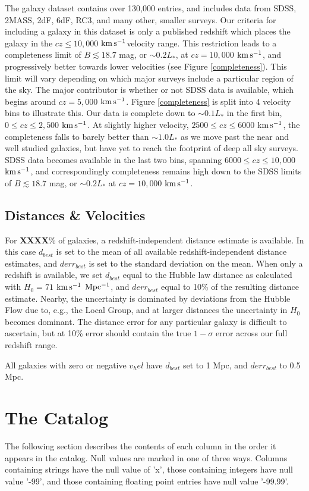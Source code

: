 \documentclass[iop]{emulateapj-rtx4}
\newcommand{\kms}{$\rm km\, s^{-1}$}
\begin{document}
The galaxy dataset contains over 130,000 entries, and includes data from SDSS, 2MASS, 2dF, 6dF, RC3, and many other, smaller surveys. Our criteria for including a galaxy in this dataset is only a published redshift which places the galaxy in the $cz \leq 10,000$ \kms velocity range. This restriction leads to a completeness limit of $B \lesssim 18.7$ mag, or $\sim0.2 L_*$, at $cz = 10,000$ \kms, and progressively better towards lower velocities (see Figure \ref{completeness}). This limit will vary depending on which major surveys include a particular region of the sky. The major contributor is whether or not SDSS data is available, which begins around $cz = 5,000$ \kms. Figure \ref{completeness} is split into 4 velocity bins to illustrate this. Our data is complete down to $\sim0.1 L_*$ in the first bin, $0 \leq cz \leq 2,500$ \kms. At slightly higher velocity, $2500 \leq cz \leq 6000$ \kms, the completeness falls to barely better than $\sim1.0 L_*$ as we move past the near and well studied galaxies, but have yet to reach the footprint of deep all sky surveys. SDSS data becomes available in the last two bins, spanning $6000 \leq cz \leq 10,000$ \kms, and correspondingly completeness remains high down to the SDSS limits of $B \lesssim 18.7$ mag, or $\sim0.2 L_*$ at $cz = 10,000$ \kms.


\subsection{Distances \& Velocities}
For \textbf{XXXX}\% of galaxies, a redshift-independent distance estimate is available. In this case $d_{best}$ is set to the mean of all available redshift-independent distance estimates, and $derr_{best}$ is set to the standard deviation on the mean. When only a redshift is available, we set $d_{best}$ equal to the Hubble law distance as calculated with $H_0 = 71$ \kms $~\rm Mpc^{-1}$, and $derr_{best}$ equal to 10\% of the resulting distance estimate. Nearby, the uncertainty is dominated by deviations from the Hubble Flow due to, e.g., the Local Group, and at larger distances the uncertainty in $H_0$ becomes dominant. The distance error for any particular galaxy is difficult to ascertain, but at 10\% error should contain the true $1-\sigma$ error across our full redshift range.

All galaxies with zero or negative $v_hel$ have $d_{best}$ set to 1 Mpc, and $derr_{best}$ to 0.5 Mpc. 



\section{The Catalog}
The following section describes the contents of each column in the order it appears in the catalog. Null values are marked in one of three ways. Columns containing strings have the null value of 'x', those containing integers have null value '-99', and those containing floating point entries have null value '-99.99'.
\end{document}

